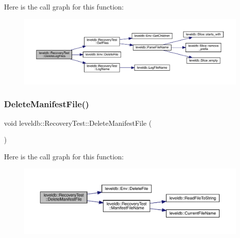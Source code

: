 Here is the call graph for this function\+:
\nopagebreak
\begin{figure}[H]
\begin{center}
\leavevmode
\includegraphics[width=350pt]{classleveldb_1_1_recovery_test_a4c1f0cadf52c5580bf6a68731bb573c0_cgraph}
\end{center}
\end{figure}
\mbox{\label{classleveldb_1_1_recovery_test_a45284a48b4457b9980ee9425ff6357bc}} 
\subsubsection{\texorpdfstring{DeleteManifestFile()}{DeleteManifestFile()}}
{\footnotesize\ttfamily void leveldb\+::\+Recovery\+Test\+::\+Delete\+Manifest\+File (\begin{DoxyParamCaption}{ }\end{DoxyParamCaption})\hspace{0.3cm}{\ttfamily [inline]}}

Here is the call graph for this function\+:
\nopagebreak
\begin{figure}[H]
\begin{center}
\leavevmode
\includegraphics[width=350pt]{classleveldb_1_1_recovery_test_a45284a48b4457b9980ee9425ff6357bc_cgraph}
\end{center}
\end{figure}
\mbox{\label{classleveldb_1_1_recovery_test_a1e7db47a1e8abe79a30b6f009b6877b1}} 
